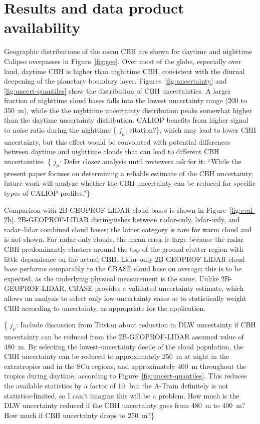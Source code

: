 \documentclass[essd,manuscript]{copernicus}\usepackage[]{graphicx}\usepackage[]{color}
\newcommand{\hlnum}[1]{\textcolor[rgb]{0.686,0.059,0.569}{#1}}%
\newcommand\comment[2]{\{\hlnum{ \textit{#1}: #2}\}}
\newcommand\commentjm[1]{\comment{$j_\mu$}{#1}}
\begin{document}

\section{Results and data product availability}
\label{sec:results}

Geographic distributions of the mean CBH are shown for daytime and nighttime
Calipso overpasses in Figure~\ref{fig:geo}.  Over most of the globe, especially
over land, daytime CBH is higher than nighttime CBH, consistent with the diurnal
deepening of the planetary boundary layer.  Figures~\ref{fig:uncertainty} and
\ref{fig:uncert-quantiles} show the distribution of CBH uncertainties.  A larger
fraction of nighttime cloud bases falls into the lowest uncertainty range (200
to 350~m), while the the nighttime uncertainty distribution peaks somewhat
higher than the daytime uncertainty distribution.  CALIOP benefits from higher
signal to noise ratio during the nighttime \commentjm{citation?}, which may lead
to lower CBH uncertainty, but this effect would be convoluted with potential
differences between daytime and nighttime clouds that can lead to different CBH
uncertainties.  \commentjm{Defer closer analysis until reviewers ask for it:
  ``While the present paper focuses on determining a reliable estimate of the
  CBH uncertainty, future work will analyze whether the CBH uncertainty can be
  reduced for specific types of CALIOP profiles.''}

Comparison with 2B-GEOPROF-LIDAR cloud bases is shown in
Figure~\ref{fig:eval-2b}.   2B-GEOPROF-LIDAR distinguishes between radar-only,
lidar-only, and radar--lidar combined cloud bases; the latter category is rare
for warm cloud and is not shown.  For radar-only clouds, the mean error is large
because the radar CBH predominantly clusters around the top of the
ground clutter region with little dependence on the actual CBH.
Lidar-only 2B-GEOPROF-LIDAR cloud base performs comparably to the CBASE cloud
base on average; this is to be expected, as the underlying physical measurement
is the same.   Unlike 2B-GEOPROF-LIDAR, CBASE provides a validated uncertainty
estimate, which allows an analysis to select only
low-uncertainty cases or to statistically weight CBH according to
uncertainty, as appropriate for the application.

\commentjm{Include discussion from Tristan about reduction in DLW uncertainty
  \citep{Stephens2012a,Stephens2012b} if CBH uncertainty can be reduced from the
  2B-GEOPROF-LIDAR assumed value of 480~m.  By selecting the lowest-uncertainty
  decile of the cloud population, the CBH uncertainty can be reduced to
  approximately 250~m at night in the extratropics and in the SCu regions, and
  approximately 400~m throughout the tropics during daytime, according to
  Figure~\ref{fig:uncert-quantiles}.  This reduces the available statistics by a
  factor of 10, but the A-Train definitely is not statistics-limited, so I can't
  imagine this will be a problem.  How much is the DLW uncertainty reduced if
  the CBH uncertainty goes from 480~m to 400~m?  How much if CBH uncertainty
  drops to 250~m?}
\end{document}

